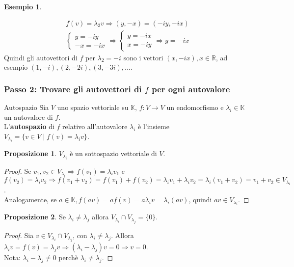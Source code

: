 \documentclass[a4paper]{article}
\theoremstyle{definition}
\newtheorem*{es}{Esempio}
\newtheorem*{prop}{Proposizione}
\begin{document}
\begin{es}
\begin{itemize}
\begin{align*}
					f(v) = \lambda_2 v \Rightarrow (y, -x) = (-iy, -ix) \\
					\begin{cases}
						y = - iy \\
						- x = - ix
					\end{cases} \Rightarrow \begin{cases}
						y = - ix \\
						x = - iy
					\end{cases} \Rightarrow y = - ix
				\end{align*}
				Quindi gli autovettori di $f$ per $\lambda_2 = -i$ sono i vettori $(x, -ix), x \in \mathbb{R}$, ad esempio $(1, -i), (2, -2i), (3, -3i), ...$.
		\end{itemize}
	\end{es}

	\subsubsection{Passo 2: Trovare gli autovettori di $f$ per ogni autovalore}
	\begin{deff}{Autospazio}{}
		Sia $V$ uno spazio vettoriale su $\mathbb{K}$, $f: V \to V$ un endomorfismo e $\lambda_i \in \mathbb{K}$ un autovalore di $f$. \\
		L'\textbf{autospazio} di $f$ relativo all'autovalore $\lambda_i$ è l'insieme $V_{\lambda_i} = \{v \in V \mid f(v) = \lambda_i v\}$.
	\end{deff}
	\begin{prop}
		$V_{\lambda_i}$ è un sottospazio vettoriale di $V$.
	\end{prop}
	\begin{proof}
		Se $v_1, v_2 \in V_{\lambda_i} \Rightarrow f(v_1) = \lambda_i v_1$ e $f(v_2) = \lambda_i v_2 \Rightarrow f(v_1 + v_2) = f(v_1) + f(v_2) = \lambda_i v_1 + \lambda_i v_2 = \lambda_i(v_1 + v_2) = v_1 + v_2 \in V_{\lambda_i}$. \\
		Analogamente, se $a \in \mathbb{K}, f(av) = af(v) = a\lambda_i v = \lambda_i (av)$, quindi $av \in V_{\lambda_i}$.
	\end{proof}
	\begin{prop}
		Se $\lambda_i \ne \lambda_j$ allora $V_{\lambda_i} \cap V_{\lambda_j} = \{0\}$.
	\end{prop}
	\begin{proof}
		Sia $v \in V_{\lambda_i} \cap V_{\lambda_j}$, con $\lambda_i \ne \lambda_j$.
		Allora $\lambda_i v = f(v) = \lambda_j v \Rightarrow (\lambda_i - \lambda_j)v = 0 \Rightarrow v = 0$. \\
		Nota: $\lambda_i - \lambda_j \ne 0$ perchè $\lambda_i \ne \lambda_j$.
	\end{proof}
\end{document}
